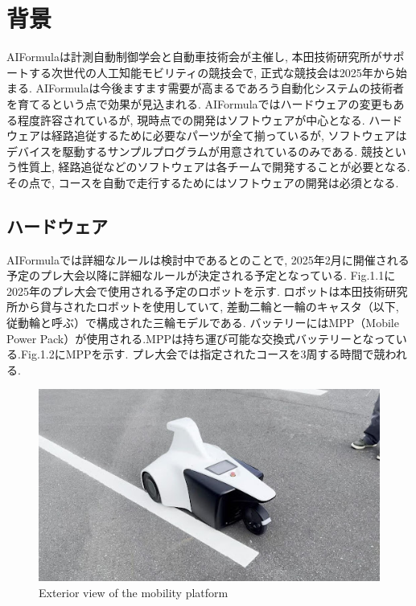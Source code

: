 
\section{背景}
AIFormulaは計測自動制御学会と自動車技術会が主催し, 本田技術研究所がサポートする次世代の人工知能モビリティの競技会で, 正式な競技会は2025年から始まる.
AIFormulaは今後ますます需要が高まるであろう自動化システムの技術者を育てるという点で効果が見込まれる.
AIFormulaではハードウェアの変更もある程度許容されているが, 現時点での開発はソフトウェアが中心となる.
ハードウェアは経路追従するために必要なパーツが全て揃っているが, ソフトウェアはデバイスを駆動するサンプルプログラムが用意されているのみである.
競技という性質上, 経路追従などのソフトウェアは各チームで開発することが必要となる.
その点で, コースを自動で走行するためにはソフトウェアの開発は必須となる.

\subsection{ハードウェア}
AIFormulaでは詳細なルールは検討中であるとのことで, 2025年2月に開催される予定のプレ大会以降に詳細なルールが決定される予定となっている.
Fig.1.1に2025年のプレ大会で使用される予定のロボットを示す.
ロボットは本田技術研究所から貸与されたロボットを使用していて, 差動二輪と一輪のキャスタ（以下, 従動輪と呼ぶ）で構成された三輪モデルである.
バッテリーにはMPP（Mobile Power Pack）が使用される.MPPは持ち運び可能な交換式バッテリーとなっている.Fig.1.2にMPPを示す.
プレ大会では指定されたコースを3周する時間で競われる.

\begin{figure}[H]
  \centering
 \includegraphics[keepaspectratio, scale=0.6]
      {images/ExteriorViewOfTheMobilityPlatform.png}
 \caption{Exterior view of the mobility platform}
 \label{fig:robot view}
\end{figure}

